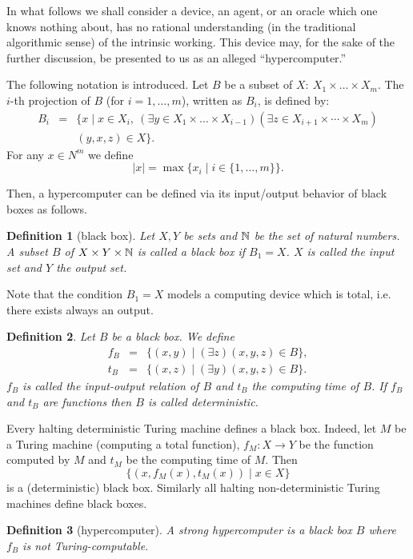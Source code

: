 \documentclass[12pt]{article}
\newtheorem{definition}{{\bf Definition} }
\begin{document}
In what follows we shall consider a
 device, an agent, or an oracle which one knows nothing about, has no
rational understanding (in the traditional algorithmic sense) of
the intrinsic working.
This device may, for the sake of the further discussion, be presented to us as an alleged  ``hypercomputer.''

The following  notation is introduced. Let $B$ be a subset of $X\colon\ X_1 \times \ldots
\times X_m$. The $i$-th projection of $B$ (for $i=1,\ldots , m$),
written as $B_i$, is defined by:
%
\[
\begin{array}{lcl}
B_i &=& \{x \mid x \in X_i, \ (\exists y \in X_1 \times \ldots
\times X_{i-1})(\exists z \in X_{i+1} \times \cdots \times X_m)\\
& & (y,x,z) \in X\}.
\end{array}
\]
For any $x \in N^m$ we define
$$|x| = \max\{x_i \mid i \in \{1,\ldots,m\}\}.$$

Then, a hypercomputer can be defined via its input/output behavior of black boxes as follows.

\begin{definition}[black box]\label{def.blackb}
Let $X,Y$ be sets and ${\Bbb N}$ be the set of natural numbers. A subset
$B$ of $X \times Y \times {\Bbb N}$ is called a {\em black box} if $B_1
= X$. $X$ is called the {\em input set} and $Y$ the {\em output
set.}
\end{definition}
Note that the condition $B_1 = X$ models a computing device
which is total, i.e. there exists always an output.
%
\begin{definition}
Let $B$ be a black box. We define
%
\begin{eqnarray*}
f_B &=& \{(x,y) \mid (\exists z)(x,y,z) \in B\},\\[1ex]
%
t_B &=& \{(x,z) \mid (\exists y)(x,y,z) \in B\}.
\end{eqnarray*}
%
$f_B$ is called the {\em input-output relation} of $B$ and $t_B$
the {\em computing time} of $B$. If $f_B$ and $t_B$ are functions
then $B$ is called deterministic.
\end{definition}
Every halting deterministic Turing machine defines a
black box. Indeed, let $M$ be a Turing machine (computing a total
function), $f_M\colon X \to Y$ be the function computed by $M$ and
$t_M$ be the computing time of $M$. Then
$$\{(x,f_M(x),t_M(x)) \mid x \in X\}$$
is a (deterministic) black box. Similarly all halting
non-deterministic Turing machines define black boxes.


\begin{definition}[hypercomputer]\label{def.hyperc}
A {\em strong hypercomputer} is a black box $B$ where $f_B$ is not
Turing-computable.
\end{definition}
\end{document}
